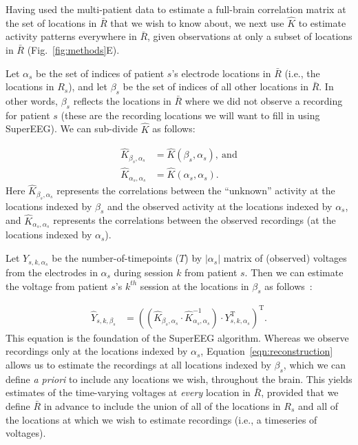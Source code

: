 \documentclass[11pt]{article}
\begin{document}
Having used the multi-patient data to estimate a full-brain correlation matrix
at the set of locations in $\bar{R}$ that we wish to know about, we next use
$\hat{K}$ to estimate activity patterns everywhere in $\bar{R}$, given
observations at only a subset of locations in $\bar{R}$
(Fig.~\ref{fig:methods}E).

Let $\alpha_s$ be the set of indices of patient $s$'s electrode locations in
$\bar{R}$ (i.e., the locations in $R_s$), and let $\beta_s$ be the set of
indices of all other locations in $\bar{R}$. In other words, $\beta_s$ reflects
the locations in $\bar{R}$ where we did not observe a recording for patient $s$
(these are the recording locations we will want to fill in using SuperEEG). We
can sub-divide $\hat{K}$ as follows:

\begin{align}
\hat{K}_{\beta_s,\alpha_s} &= \hat{K}(\beta_s,\alpha_s),~\mathrm{and}\label{eqn:Kba}\\
\hat{K}_{\alpha_s,\alpha_s} &= \hat{K}(\alpha_s,\alpha_s)\label{eqn:Kaa}.
\end{align}
Here $\hat{K}_{\beta_s, \alpha_s}$ represents the correlations between
the ``unknown'' activity at the locations indexed by $\beta_s$ and the
observed activity at the locations indexed by $\alpha_s$, and
$\hat{K}_{\alpha_s, \alpha_s}$ represents the correlations between the
observed recordings (at the locations indexed by $\alpha_s$).

Let $Y_{s,k,\alpha_s}$ be the number-of-timepoints ($T$) by
$\left|\alpha_s\right|$ matrix of (observed) voltages from the electrodes in
$\alpha_s$ during session $k$ from patient $s$. Then we can estimate the voltage
from patient $s$'s $k^{th}$ session at the locations in $\beta_s$ as
follows~\citep{Rasm06}:

\begin{align}
\hat{Y}_{s,k,\beta_s} &= ((\hat{K}_{\beta_s,\alpha_s}\cdot\hat{K}_{\alpha_s,\alpha_s}^{-1})\cdot Y_{s,k,\alpha_s}^\mathrm{T})^\mathrm{T}.\label{eqn:reconstruction}
\end{align}
This equation is the foundation of the SuperEEG algorithm.  Whereas we
observe recordings only at the locations indexed by $\alpha_s$,
Equation~\ref{eqn:reconstruction} allows us to estimate the recordings
at all locations indexed by $\beta_s$, which we can define \textit{a priori}
to include any locations we wish, throughout the brain.  This yields
estimates of the time-varying voltages at \textit{every} location in
$\bar{R}$, provided that we define $\bar{R}$ in advance to include the
union of all of the locations in $R_s$ and all of the locations
at which we wish to estimate recordings (i.e., a timeseries of
voltages).
\end{document}
